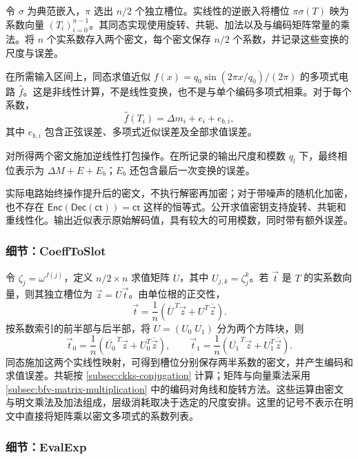  令 $\sigma$ 为典范嵌入，$\pi$ 选出 $n/2$ 个独立槽位。实线性的逆嵌入将槽位 $\pi\sigma(T)$ 映为系数向量 $(T_i)_{i=0}^{n-1}$。其同态实现使用旋转、共轭、加法以及与编码矩阵常量的乘法。将 $n$ 个实系数存入两个密文，每个密文保存 $n/2$ 个系数，并记录这些变换的尺度与误差。

 在所需输入区间上，同态求值近似 $f(x)=q_0\sin(2\pi x/q_0)/(2\pi)$ 的多项式电路 $\widehat f$。这是非线性计算，不是线性变换，也不是与单个编码多项式相乘。对于每个系数，
\[
\widehat f(T_i)=\Delta m_i+e_i+e_{b,i},
\]
其中 $e_{b,i}$ 包含正弦误差、多项式近似误差及全部求值误差。

 对所得两个密文施加逆线性打包操作。在所记录的输出尺度和模数 $q_l$ 下，最终相位表示为 $\Delta M+E+E_b$；$E_b$ 还包含最后一次变换的误差。

 实际电路始终操作提升后的密文，不执行解密再加密；对于带噪声的随机化加密，也不存在 $\mathsf{Enc}(\mathsf{Dec}(\textsf{ct}))=\textsf{ct}$ 这样的恒等式。公开求值密钥支持旋转、共轭和重线性化。输出近似表示原始解码值，具有较大的可用模数，同时带有额外误差。

\subsubsection{细节：\textsf{CoeffToSlot}}
\label{subsubsec:ckks-bootstrapping-coefftoslot-details}

令 $\zeta_j=\omega^{J(j)}$，定义 $n/2\times n$ 求值矩阵 $U$，其中 $U_{j,k}=\zeta_j^k$。若 $\vec t$ 是 $T$ 的实系数向量，则其独立槽位为 $\vec z=U\vec t$。由单位根的正交性，
\[
\vec t=\frac{1}{n}(\overline U^{\,T}\vec z+U^T\overline{\vec z}).
\]
按系数索引的前半部与后半部，将 $U=(U_0\;U_1)$ 分为两个方阵块，则
\[
\vec t_0=\frac{1}{n}(\overline{U_0}^{\,T}\vec z+U_0^T\overline{\vec z}),\qquad
\vec t_1=\frac{1}{n}(\overline{U_1}^{\,T}\vec z+U_1^T\overline{\vec z}).
\]
同态施加这两个实线性映射，可得到槽位分别保存两半系数的密文，并产生编码和求值误差。共轭按 \autoref{subsec:ckks-conjugation} 计算；矩阵与向量乘法采用 \autoref{subsec:bfv-matrix-multiplication} 中的编码对角线和旋转方法。这些运算由密文与明文乘法及加法组成，层级消耗取决于选定的尺度安排。这里的记号不表示在明文中直接将矩阵乘以密文多项式的系数列表。

\subsubsection{细节：\textsf{EvalExp}}
\label{subsubsec:ckks-bootstrapping-evalexp-details}


